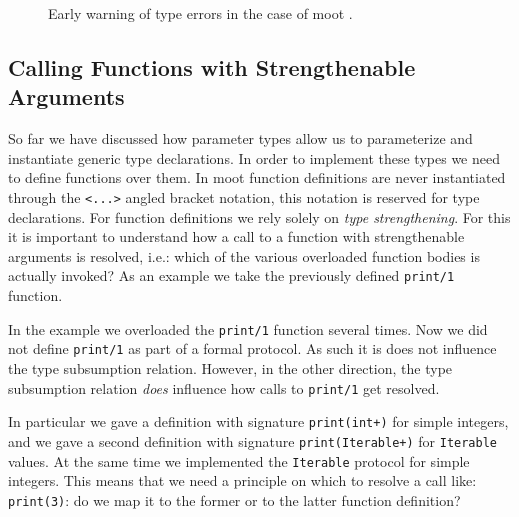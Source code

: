 \documentclass{sigplanconf}
\begin{document}
\begin{figure}[t]
 \caption{Early warning of type errors in the case of {\sc moot}
  .}\label{fig:early}
\end{figure}

\subsection{Calling Functions with Strengthenable Arguments}

So far we have discussed how parameter types allow us to parameterize
and instantiate generic type declarations. In order to implement these
types we need to define functions over them. In {\sc moot} function
definitions are never instantiated through the \verb+<...>+ angled
bracket notation, this notation is reserved for type declarations. For
function definitions we rely solely on \emph{type strengthening}. For
this it is important to understand how a call to a function with
strengthenable arguments is resolved, i.e.: which of the various
overloaded function bodies is actually invoked?  As an example we take
the previously defined \verb+print/1+ function.

In the example we overloaded the \verb+print/1+ function several
times. Now we did not define \verb+print/1+ as part of a formal
protocol. As such it is does not influence the type subsumption
relation. However, in the other direction, the type subsumption
relation \emph{does} influence how calls to \verb+print/1+ get
resolved.

In particular we gave a definition with signature \verb-print(int+)-
for simple integers, and we gave a second definition with signature
\verb-print(Iterable+)- for \verb+Iterable+ values. At the same time
we implemented the \verb+Iterable+ protocol for simple integers. This
means that we need a principle on which to resolve a call like:
\verb+print(3)+: do we map it to the former or to the latter function
definition?
\end{document}
